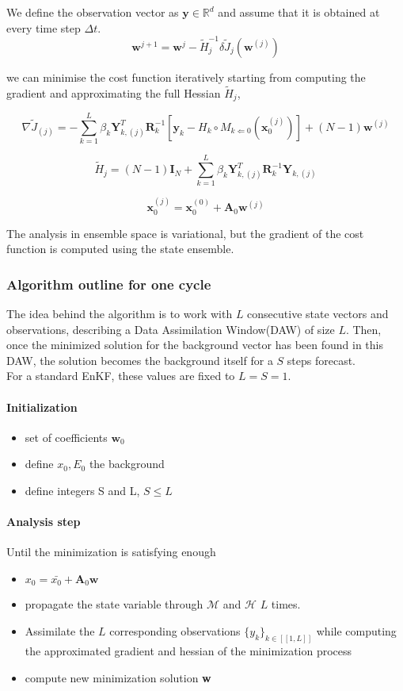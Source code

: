 \documentclass[a4,12pt]{article}
\begin{document}
We define the observation vector as $\textbf{y} \in \mathbb{R}^d$ and assume that it is obtained at every time step $\Delta t$. \\

$$\textbf{w}^{j+1} = \textbf{w}^{j} - \tilde{H}_{j}^{-1} \delta \tilde{J}_{j}(\textbf{w}^{(j)})$$

we can minimise the cost function iteratively starting from computing the gradient and approximating the full Hessian $\tilde{H}_{j}$,

$$\nabla \tilde{J}_{(j)} = -\sum_{k=1}^{L}\beta_{k}\textbf{Y}_{k,(j)}^{T}\textbf{R}_{k}^{-1}[\textbf{y}_{k} - H_{k}\circ M_{k\Leftarrow 0}(\textbf{x}_{0}^{(j)})] + (N-1)\textbf{w}^{(j)}$$

$$\tilde{H}_{j}=(N-1)\textbf{I}_{N}+\sum_{k=1}^{L} \beta_{k} \textbf{Y}_{k,(j)}^{T}\textbf{R}^{-1}_{k} \textbf{Y}_{k,(j)} $$

$$\textbf{x}_{0}^{(j)} = \textbf{x}_{0}^{(0)} + \textbf{A}_{0}\textbf{w}^{(j)}$$

The analysis in ensemble space is variational, but the gradient of the cost function is computed using the state ensemble.
\subsubsection{Algorithm outline for one cycle}
The idea behind the algorithm is to work with $L$ consecutive state vectors and observations, describing a Data Assimilation Window(DAW) of size $L$. Then, once the minimized solution for the background vector has been found in this DAW, the solution becomes the background itself for a $S$ steps forecast. \\
For a standard EnKF, these values are fixed to $L = S = 1$. \\

\paragraph{Initialization}
\begin{itemize}
\item set of coefficients $\textbf{w}_0$
\item define $x_0, E_0$ the background
\item define integers S and L, $S \le L$
\end{itemize}
\paragraph{Analysis step}
Until the minimization is satisfying enough
\begin{itemize}
\item $x_0 = \bar{x_0} + \textbf{A}_0 \textbf{w}$
\item propagate the state variable through $\mathcal{M}$ and $\mathcal{H}$ $L$ times.
\item Assimilate the $L$ corresponding observations $\{y_{k}\}_{k \in [\![1,L]\!] }$ while computing the approximated gradient and hessian of the minimization process
\item compute new minimization solution \textbf{w}
\end{itemize}
\end{document}
